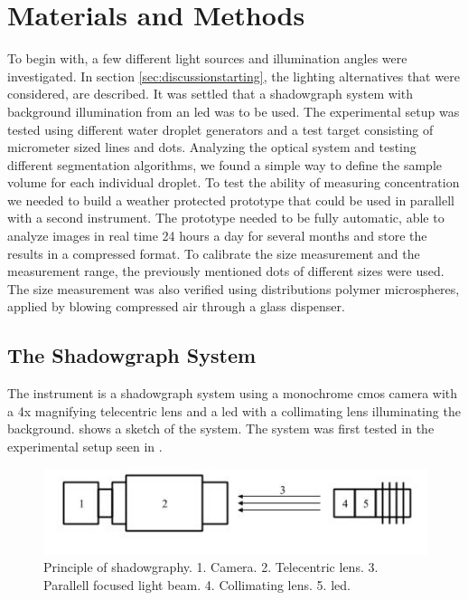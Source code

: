 
\chapter{Materials and Methods}
\label{chap:methods}

To begin with, a few different light sources and illumination angles were investigated. In section \ref{sec:discussionstarting}, the lighting alternatives that were considered, are described. It was settled that a shadowgraph system with background illumination from an \gls{led} was to be used. The experimental setup was tested using different water droplet generators and a test target consisting of micrometer sized lines and dots. Analyzing the optical system and testing different segmentation algorithms, we found a simple way to define the sample volume for each individual droplet. To test the ability of measuring concentration we needed to build a weather protected prototype that could be used in parallell with a second instrument. The prototype needed to be fully automatic, able to analyze images in real time 24 hours a day for several months and store the results in a compressed format. To calibrate the size measurement and the measurement range, the previously mentioned dots of different sizes were used. The size measurement was also verified using distributions polymer microspheres, applied by blowing compressed air through a glass dispenser.

\section{The Shadowgraph System}

The instrument is a shadowgraph system using a monochrome \gls{cmos} camera with a 4x magnifying telecentric lens and a \gls{led} with a collimating lens illuminating the background.  shows a sketch of the system. The system was first tested in the experimental setup seen in . 

\begin{figure}[ht]
\centering\includegraphics[width=0.75\linewidth]{./figures/shadowprinc.jpg}
\caption{Principle of shadowgraphy. 1. Camera. 2. Telecentric lens. 3. Parallell focused light beam. 4. Collimating lens. 5. \gls{led}.}
\label{fig:shadowprinc}
\end{figure}


